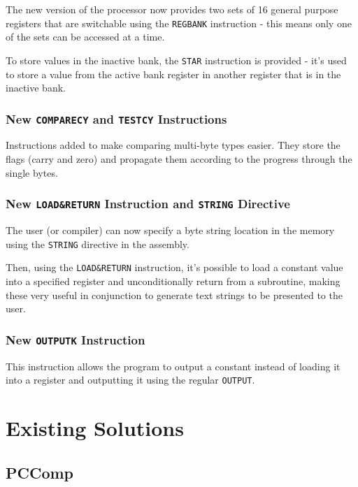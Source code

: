         The new version of the processor now provides two sets of 16 general purpose registers that are switchable using the \texttt{REGBANK} instruction - this means only one of the sets can be accessed at a time.

        To store values in the inactive bank, the \texttt{STAR} instruction is provided - it's used to store a value from the active bank register in another register that is in the inactive bank.

        \subsection{New \texttt{COMPARECY} and \texttt{TESTCY} Instructions}

        Instructions added to make comparing multi-byte types easier. They store the flags (carry and zero) and propagate them according to the progress through the single bytes.

        \subsection{New \texttt{LOAD\&RETURN} Instruction and \texttt{STRING} Directive}

        The user (or compiler) can now specify a byte string location in the memory using the \texttt{STRING} directive in the assembly.

        Then, using the \texttt{LOAD\&RETURN} instruction, it's possible to load a constant value into a specified register and unconditionally return from a subroutine, making these very useful in conjunction to generate text strings to be presented to the user.

        \subsection{New \texttt{OUTPUTK} Instruction}

        This instruction allows the program to output a constant instead of loading it into a register and outputting it using the regular \texttt{OUTPUT}.



\chapter{Existing Solutions}\label{existing}

    \section{PCComp}\label{pccomp}

